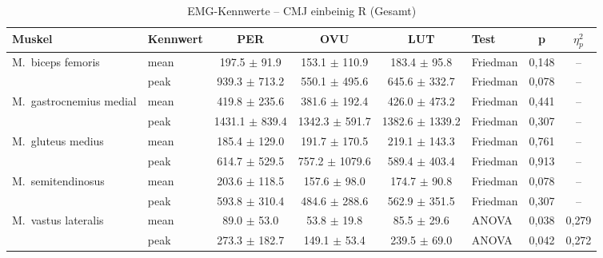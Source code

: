 \begin{table}[H]
  \centering
  \caption{EMG-Kennwerte – CMJ einbeinig R (Gesamt)}
  \label{tab:CMJ_einbeinig_R_Gesamt}
  \small
  \begin{tabular}{l l c c c l c c}
    \hline
    \textbf{Muskel} & \textbf{Kennwert} & \textbf{PER} & \textbf{OVU} & \textbf{LUT} & \textbf{Test} & \textbf{p} & \textbf{$\eta^2_p$} \\
    \hline
    M.~biceps femoris & mean & 197.5 $\pm$ 91.9 & 153.1 $\pm$ 110.9 & 183.4 $\pm$ 95.8 & Friedman & 0{,}148 & -- \\
     & peak & 939.3 $\pm$ 713.2 & 550.1 $\pm$ 495.6 & 645.6 $\pm$ 332.7 & Friedman & 0{,}078 & -- \\
    \hline
    M.~gastrocnemius medial & mean & 419.8 $\pm$ 235.6 & 381.6 $\pm$ 192.4 & 426.0 $\pm$ 473.2 & Friedman & 0{,}441 & -- \\
     & peak & 1431.1 $\pm$ 839.4 & 1342.3 $\pm$ 591.7 & 1382.6 $\pm$ 1339.2 & Friedman & 0{,}307 & -- \\
    \hline
    M.~gluteus medius & mean & 185.4 $\pm$ 129.0 & 191.7 $\pm$ 170.5 & 219.1 $\pm$ 143.3 & Friedman & 0{,}761 & -- \\
     & peak & 614.7 $\pm$ 529.5 & 757.2 $\pm$ 1079.6 & 589.4 $\pm$ 403.4 & Friedman & 0{,}913 & -- \\
    \hline
    M.~semitendinosus & mean & 203.6 $\pm$ 118.5 & 157.6 $\pm$ 98.0 & 174.7 $\pm$ 90.8 & Friedman & 0{,}078 & -- \\
     & peak & 593.8 $\pm$ 310.4 & 484.6 $\pm$ 288.6 & 562.9 $\pm$ 351.5 & Friedman & 0{,}307 & -- \\
    \hline
    M.~vastus lateralis & mean & 89.0 $\pm$ 53.0 & 53.8 $\pm$ 19.8 & 85.5 $\pm$ 29.6 & ANOVA & 0{,}038 & 0{,}279 \\
     & peak & 273.3 $\pm$ 182.7 & 149.1 $\pm$ 53.4 & 239.5 $\pm$ 69.0 & ANOVA & 0{,}042 & 0{,}272 \\
    \hline
  \end{tabular}
\end{table}

